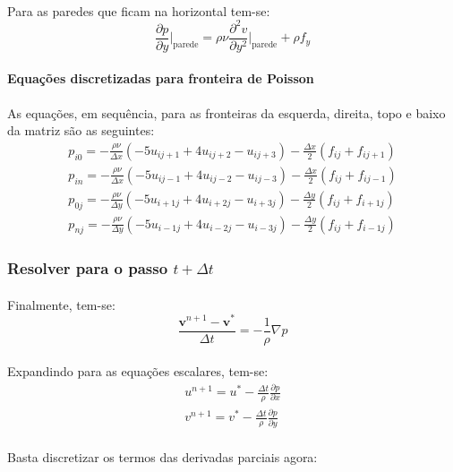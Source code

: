 \documentclass[a4paper,11pt]{article}
\begin{document}
\paragraph{} Para as paredes que ficam na horizontal tem-se:
\begin{equation}
\frac{\partial p}{\partial y}\Bigg|_{\textrm{parede}}=\rho\nu\frac{\partial^2
v}{\partial y^2}\Bigg|_{\textrm{parede}}+\rho f_y
\end{equation}
\paragraph{Equações discretizadas para fronteira de Poisson} As equações, em
sequência, para as fronteiras da esquerda, direita, topo e baixo da matriz são
as seguintes:
\begin{eqnarray}
p_{i0}=-\frac{\rho\nu}{\Delta x}(-5u_{ij+1}+4u_{ij+2}-u_{ij+3})-\frac{\Delta
x}{2}(f_{ij}+f_{ij+1})\\
p_{in}=-\frac{\rho\nu}{\Delta x}(-5u_{ij-1}+4u_{ij-2}-u_{ij-3})-\frac{\Delta
x}{2}(f_{ij}+f_{ij-1})\\
p_{0j}=-\frac{\rho\nu}{\Delta y}(-5u_{i+1j}+4u_{i+2j}-u_{i+3j})-\frac{\Delta
y}{2}(f_{ij}+f_{i+1j})\\
p_{nj}=-\frac{\rho\nu}{\Delta y}(-5u_{i-1j}+4u_{i-2j}-u_{i-3j})-\frac{\Delta
y}{2}(f_{ij}+f_{i-1j})
\end{eqnarray}

\subsubsection{Resolver para o passo $t+\Delta t$}
\paragraph{} Finalmente, tem-se:
\begin{equation}
\frac{\textbf{v}^{n+1}-\textbf{v}^*}{\Delta t}=-\frac{1}{\rho}\nabla p
\end{equation}
\paragraph{} Expandindo para as equações escalares, tem-se:
\begin{eqnarray}
u^{n+1}=u^*-\frac{\Delta t}{\rho}\frac{\partial p}{\partial x}\\
v^{n+1}=v^*-\frac{\Delta t}{\rho}\frac{\partial p}{\partial y}
\end{eqnarray}
\paragraph{} Basta discretizar os termos das derivadas parciais agora:
\end{document}
